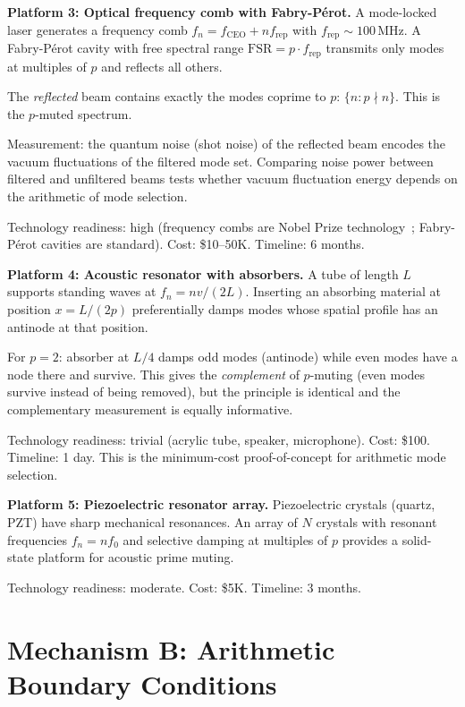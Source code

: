 \documentclass[11pt,a4paper]{article}
\begin{document}
\textbf{Platform 3: Optical frequency comb with Fabry-P\'erot.}
A mode-locked laser generates a frequency comb
$f_n = f_{\mathrm{CEO}} + n f_{\mathrm{rep}}$ with
$f_{\mathrm{rep}} \sim 100$\,MHz.
A Fabry-P\'erot cavity with free spectral range
$\mathrm{FSR} = p \cdot f_{\mathrm{rep}}$ transmits only modes
at multiples of $p$ and reflects all others.

The \emph{reflected} beam contains exactly the modes coprime to $p$:
$\{n : p \nmid n\}$. This is the $p$-muted spectrum.

Measurement: the quantum noise (shot noise) of the reflected beam
encodes the vacuum fluctuations of the filtered mode set.
Comparing noise power between filtered and unfiltered beams
tests whether vacuum fluctuation energy depends on the arithmetic
of mode selection.

Technology readiness: high (frequency combs are Nobel Prize
technology~\cite{Hansch2005}; Fabry-P\'erot cavities are standard).
Cost: \$10--50K. Timeline: 6 months.

\textbf{Platform 4: Acoustic resonator with absorbers.}
A tube of length $L$ supports standing waves at $f_n = nv/(2L)$.
Inserting an absorbing material at position $x = L/(2p)$
preferentially damps modes whose spatial profile has an antinode
at that position.

For $p = 2$: absorber at $L/4$ damps odd modes (antinode)
while even modes have a node there and survive.
This gives the \emph{complement} of $p$-muting (even modes survive
instead of being removed), but the principle is identical and
the complementary measurement is equally informative.

Technology readiness: trivial (acrylic tube, speaker, microphone).
Cost: \$100. Timeline: 1 day. This is the minimum-cost
proof-of-concept for arithmetic mode selection.

\textbf{Platform 5: Piezoelectric resonator array.}
Piezoelectric crystals (quartz, PZT) have sharp mechanical
resonances. An array of $N$ crystals with resonant frequencies
$f_n = n f_0$ and selective damping at multiples of $p$ provides
a solid-state platform for acoustic prime muting.

Technology readiness: moderate. Cost: \$5K. Timeline: 3 months.

\section{Mechanism B: Arithmetic Boundary Conditions}
\label{sec:mech_b}
\end{document}
